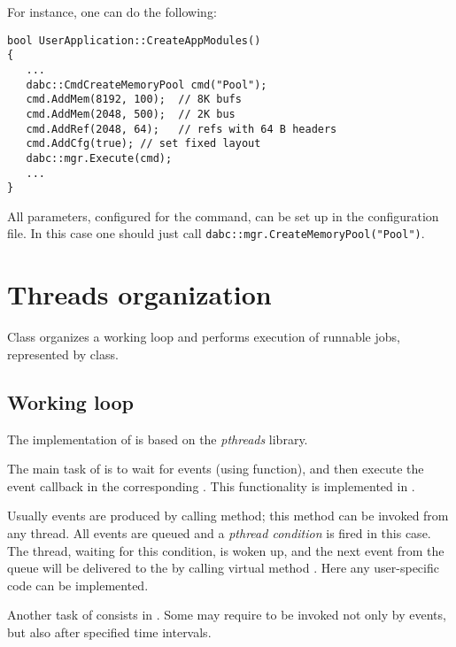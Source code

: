 For instance, one can do the following:

\begin{small}
\begin{verbatim}     
bool UserApplication::CreateAppModules()
{
   ...
   dabc::CmdCreateMemoryPool cmd("Pool");
   cmd.AddMem(8192, 100);  // 8K bufs
   cmd.AddMem(2048, 500);  // 2K bus
   cmd.AddRef(2048, 64);   // refs with 64 B headers
   cmd.AddCfg(true); // set fixed layout
   dabc::mgr.Execute(cmd);
   ...
}
\end{verbatim}     
\end{small}

All parameters, configured for the command, can be set up in the configuration file.
In this case one should just call {\tt dabc::mgr.CreateMemoryPool("Pool")}. 


\section{Threads organization}
\label{prog_services_threads}
Class  organizes a working loop and performs execution of
runnable jobs, represented by  class.


\subsection{Working loop}
\label{prog_services_threads_workloop}
The implementation of  is based on the 
{\em pthreads} library.
 
The main task of  is to wait for events (using  function),
and then execute the event callback in the corresponding
. 
This functionality is implemented  in .
 
Usually events are produced by calling  
method; this method can be invoked from any thread. All events are queued and a
{\em pthread condition} is fired in this case. 
The thread, waiting for this condition, is woken up, and the
next event from the queue will be delivered to the  by calling virtual method . 
Here any user-specific code can be implemented.

Another task of  consists in . 
Some  
may require to be invoked not only by events, but also after specified time intervals.

